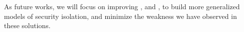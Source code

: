 


As future works, we will focus on improving \graphene{}, \gsgx{} and \civet{},
to build more generalized models of security isolation, and minimize the weakness we have observed in these solutions.